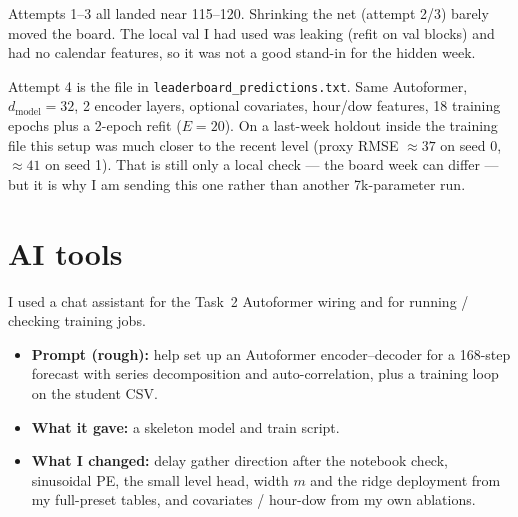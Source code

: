\documentclass[11pt,a4paper]{article}
\begin{document}
Attempts 1--3 all landed near 115--120. Shrinking the net (attempt 2/3) barely moved the board. The local val I had used was leaking (refit on val blocks) and had no calendar features, so it was not a good stand-in for the hidden week.

Attempt 4 is the file in \texttt{leaderboard\_predictions.txt}. Same Autoformer, $d_{\mathrm{model}}{=}32$, 2 encoder layers, optional covariates, hour/dow features, 18 training epochs plus a 2-epoch refit ($E{=}20$). On a last-week holdout inside the training file this setup was much closer to the recent level (proxy RMSE $\approx 37$ on seed 0, $\approx 41$ on seed 1). That is still only a local check --- the board week can differ --- but it is why I am sending this one rather than another 7k-parameter run.

\section*{AI tools}

I used a chat assistant for the Task~2 Autoformer wiring and for running / checking training jobs.

\begin{itemize}[leftmargin=1.2em,itemsep=0.15em]
\item \textbf{Prompt (rough):} help set up an Autoformer encoder--decoder for a 168-step forecast with series decomposition and auto-correlation, plus a training loop on the student CSV.
\item \textbf{What it gave:} a skeleton model and train script.
\item \textbf{What I changed:} delay gather direction after the notebook check, sinusoidal PE, the small level head, width $m$ and the ridge deployment from my full-preset tables, and covariates / hour-dow from my own ablations.
\end{itemize}
\end{document}

